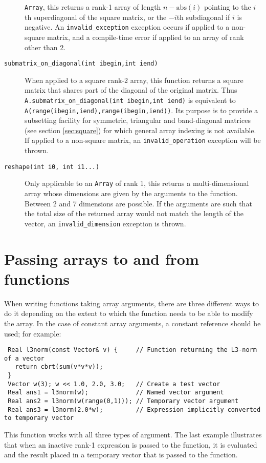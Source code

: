 \documentclass[a4,oneside]{book}
\def\codesize{\small}
\def\code#1{{\codesize\texttt{#1}}}
\def\citem#1{\item[{\codesize\texttt{#1}}]}
\begin{document}
\begin{description}
\code{Array}, this returns a rank-1 array of length
$n-\mathrm{abs}(i)$ pointing to the $i$th superdiagonal of the square
matrix, or the $-i$th subdiagonal if $i$ is negative. An
\code{invalid\_exception} exception occurs if applied to a non-square
matrix, and a compile-time error if applied to an array of rank other
than 2.
%
\citem{submatrix\_on\_diagonal(int ibegin,int iend)} When applied to a
square rank-2 array, this function returns a square matrix that shares
part of the diagonal of the original matrix.  Thus
\code{A.submatrix\_on\_diagonal(int ibegin,int iend)} is equivalent to
\code{A(range(ibegin,iend),range(ibegin,iend))}. Its purpose is to
provide a subsetting facility for symmetric, triangular and
band-diagonal matrices (see section \ref{sec:square}) for which
general array indexing is not available. If applied to a non-square
matrix, an \code{invalid\_operation} exception will be thrown.
\citem{reshape(int i0, int i1...)} Only applicable to an \code{Array}
of rank 1, this returns a multi-dimensional array whose dimensions are
given by the arguments to the function.  Between 2 and 7 dimensions
are possible. If the arguments are such that the total size of the
returned array would not match the length of the vector, an
\code{invalid\_dimension} exception is thrown.
\end{description}

\section{Passing arrays to and from functions}
\label{sec:passing}
When writing functions taking array arguments, there are three
different ways to do it depending on the extent to which the function
needs to be able to modify the array.  In the case of constant array
arguments, a constant reference should be used; for example:
\begin{lstlisting}
 Real l3norm(const Vector& v) {     // Function returning the L3-norm of a vector
   return cbrt(sum(v*v*v));
 }
 Vector w(3); w << 1.0, 2.0, 3.0;   // Create a test vector
 Real ans1 = l3norm(w);             // Named vector argument
 Real ans2 = l3norm(w(range(0,1))); // Temporary vector argument
 Real ans3 = l3norm(2.0*w);         // Expression implicitly converted to temporary vector
\end{lstlisting}
This function works with all three types of argument.  The last
example illustrates that when an inactive rank-1 expression is passed
to the function, it is evaluated and the result placed in a temporary
vector that is passed to the function.
\end{document}
